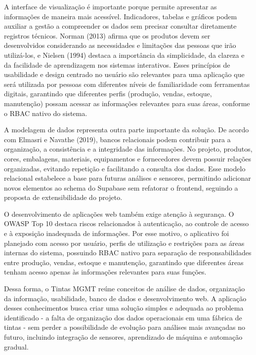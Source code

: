 \documentclass[12pt,a4paper]{article}
\begin{document}
A interface de visualização é importante porque permite apresentar as informações de maneira mais acessível. Indicadores, tabelas e gráficos podem auxiliar a gestão a compreender os dados sem precisar consultar diretamente registros técnicos. Norman (2013) afirma que os produtos devem ser desenvolvidos considerando as necessidades e limitações das pessoas que irão utilizá-los, e Nielsen (1994) destaca a importância da simplicidade, da clareza e da facilidade de aprendizagem nos sistemas interativos. Esses princípios de usabilidade e design centrado no usuário são relevantes para uma aplicação que será utilizada por pessoas com diferentes níveis de familiaridade com ferramentas digitais, garantindo que diferentes perfis (produção, vendas, estoque, manutenção) possam acessar as informações relevantes para suas áreas, conforme o RBAC nativo do sistema.

A modelagem de dados representa outra parte importante da solução. De acordo com Elmasri e Navathe (2019), bancos relacionais podem contribuir para a organização, a consistência e a integridade das informações. No projeto, produtos, cores, embalagens, materiais, equipamentos e fornecedores devem possuir relações organizadas, evitando repetição e facilitando a consulta dos dados. Esse modelo relacional estabelece a base para futuras análises e sensores, permitindo adicionar novos elementos ao schema do Supabase sem refatorar o frontend, seguindo a proposta de extensibilidade do projeto.

O desenvolvimento de aplicações web também exige atenção à segurança. O OWASP Top 10 destaca riscos relacionados à autenticação, ao controle de acesso e à exposição inadequada de informações. Por esse motivo, o aplicativo foi planejado com acesso por usuário, perfis de utilização e restrições para as áreas internas do sistema, possuindo RBAC nativo para separação de responsabilidades entre produção, vendas, estoque e manutenção, garantindo que diferentes áreas tenham acesso apenas às informações relevantes para suas funções.

Dessa forma, o Tintas MGMT reúne conceitos de análise de dados, organização da informação, usabilidade, banco de dados e desenvolvimento web. A aplicação desses conhecimentos busca criar uma solução simples e adequada ao problema identificado - a falta de organização dos dados operacionais em uma fábrica de tintas - sem perder a possibilidade de evolução para análises mais avançadas no futuro, incluindo integração de sensores, aprendizado de máquina e automação gradual.
\end{document}
